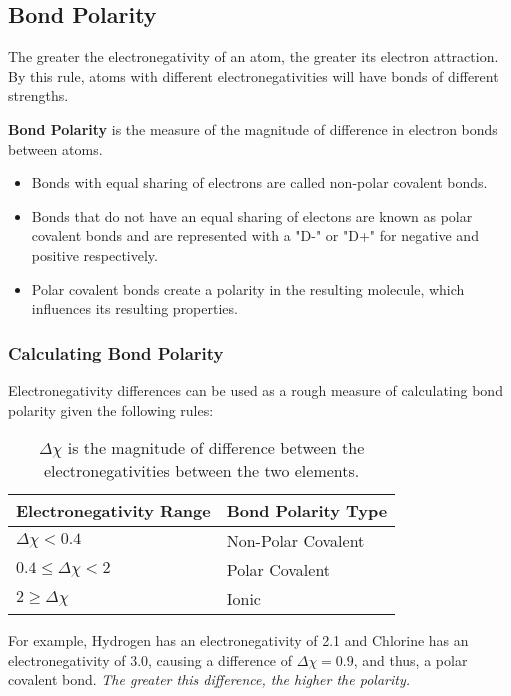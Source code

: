 \subsection{Bond Polarity}

The greater the electronegativity of an atom, the greater its electron attraction. By this rule, atoms with different electronegativities will have bonds of different strengths.

\begin{defn}
\textbf{Bond Polarity} is the measure of the magnitude of difference in electron bonds between atoms.
\end{defn}

\begin{itemize}
\item Bonds with equal sharing of electrons are called non-polar covalent bonds.
\item Bonds that do not have an equal sharing of electons are known as polar covalent bonds and are represented with a "D-" or "D+" for negative and positive respectively.
\item Polar covalent bonds create a polarity in the resulting molecule, which influences its resulting properties.
\end{itemize}

\subsubsection{Calculating Bond Polarity}

Electronegativity differences can be used as a rough measure of calculating bond polarity given the following rules:


\begin{table}[H]
\centering
\begin{tabular}{|l|l|}
\hline
\textbf{Electronegativity Range} & \textbf{Bond Polarity Type} \\
\hline
$\Delta \chi < 0.4$ 		& Non-Polar Covalent \\
$0.4 \le \Delta \chi < 2$  	& Polar Covalent \\
$2 \ge \Delta \chi$			& Ionic \\
\hline
\end{tabular}
\caption{$\Delta \chi$ is the magnitude of difference between the electronegativities between the two elements.}
\end{table}

\noindent
For example, Hydrogen has an electronegativity of 2.1 and Chlorine has an electronegativity of 3.0, causing a difference of $\Delta \chi = 0.9$, and thus, a polar covalent bond. \textit{The greater this difference, the higher the polarity.} \\

